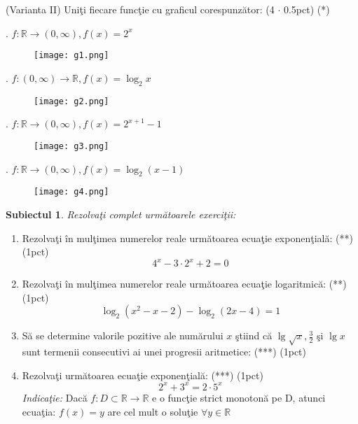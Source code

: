 \documentclass[a4paper, 12pt]{scrartcl}
\theoremstyle{plain}
\newtheorem{subiect}{Subiectul}
\newcommand{\Subiect}[1]{
    {
        \large
        \begin{subiect}
            #1
        \end{subiect}
    }
}
\begin{document}
\newpage
\noindent (Varianta II) Uni\c ti fiecare func\c tie cu graficul corespunz\u ator: (4 \(\cdot\) 0.5pct) \hfill (*)


\begin{paracol}{2}
    . \( f: \mathbb{R} \rightarrow ( 0, \infty ),  f(x) = 2^x \)
    \switchcolumn
    \begin{figure}
        \texttt{[image: g1.png]}
    \end{figure}
\end{paracol}

\begin{paracol}{2}
    . \( f: ( 0, \infty ) \rightarrow \mathbb{R}, f(x) = \log_2{x} \)
    \switchcolumn
    \begin{figure}
        \texttt{[image: g2.png]}
    \end{figure}
\end{paracol}
    
\begin{paracol}{2}
    . \( f: \mathbb{R} \rightarrow ( 0, \infty ), f(x) = 2^{x+1} - 1 \)
    \switchcolumn
    \begin{figure}
        \texttt{[image: g3.png]}
    \end{figure}
\end{paracol}

\begin{paracol}{2}
    . \( f: \mathbb{R} \rightarrow ( 0, \infty ), f(x) = \log_2({x - 1}) \)
    \switchcolumn
    \begin{figure}[h]
        \texttt{[image: g4.png]}
    \end{figure}
\end{paracol}

\newpage

\Subiect{Rezolva\c ti complet urm\u atoarele exerci\c tii:}

\begin{enumerate}[label=\textbf{\arabic*})]
    \item {
        Rezolva\c ti \^in mul\c timea numerelor reale urm\u atoarea ecua\c tie exponen\c tial\u a: (**) \hfill (1pct)
        \[
            4^x - 3 \cdot 2^x + 2 = 0
        \]    
    }
    \item {
        Rezolva\c ti \^in mul\c timea numerelor reale urm\u atoarea ecua\c tie logaritmic\u a: (**) \hfill (1pct)
        \[
            \log_2 (x^2 - x - 2) - \log_2 (2x - 4) = 1
        \]    
    }
    \item {
        S\u a se determine valorile pozitive ale num\u arului \(x\) \c stiind c\u a \( \lg \sqrt{x}, \frac{3}{2} \) \c 
        si \( \lg x \) sunt termenii consecutivi ai unei progresii aritmetice: (***) \hfill (1pct)
    }
    \item {
        Rezolva\c ti urm\u atoarea ecua\c tie exponen\c tial\u a: (***) \hfill (1pct)
        \[
            2^x + 3^x = 2 \cdot 5^x    
        \]    
        \textit{Indica\c tie:} Dac\u a \( f:D \subset \mathbb{R} \rightarrow \mathbb{R} \) e o func\c tie strict monoton\u a pe D,
        atunci ecua\c tia: \( f(x) = y \) are cel mult o solu\c tie \( \forall y \in \mathbb{R} \) 
    }
\end{enumerate}
\end{document}
